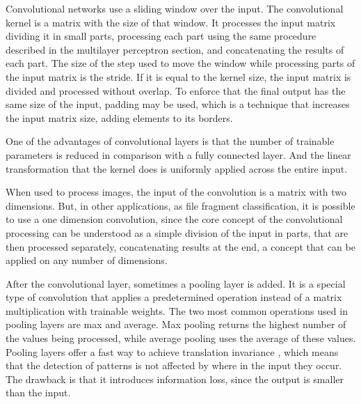 
Convolutional networks \cite{lecun_backpropagation_1989} \cite{lecun_convolutional_1995} use a sliding window over the input. The convolutional kernel is a matrix with the size of that window. It processes the input matrix dividing it in small parts, processing each part using the same procedure described in the multilayer perceptron section, and concatenating the results of each part. The size of the step used to move the window while processing parts of the input matrix is the stride. If it is equal to the kernel size, the input matrix is divided and processed without overlap. To enforce that the final output has the same size of the input, padding may be used, which is a technique that increases the input matrix size, adding elements to its borders.

One of the advantages of convolutional layers is that the number of trainable parameters is reduced in comparison with a fully connected layer. And the linear transformation that the kernel does is uniformly applied across the entire input.

When used to process images, the input of the convolution is a matrix with two dimensions. But, in other applications, as file fragment classification, it is possible to use a one dimension convolution, since the core concept of the convolutional processing can be understood as a simple division of the input in parts, that are then processed separately, concatenating results at the end, a concept that can be applied on any number of dimensions.


After the convolutional layer, sometimes a pooling layer is added. It is a special type of convolution that applies a predetermined operation instead of a matrix multiplication with trainable weights. The two most common operations used in pooling layers are max and average. Max pooling returns the highest number of the values being processed, while average pooling uses the average of these values. Pooling layers offer a fast way to achieve translation invariance \cite{hinton_learning_1987}, which means that the detection of patterns is not affected by where in the input they occur. The drawback is that it introduces information loss, since the output is smaller than the input.
